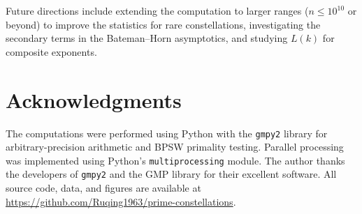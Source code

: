 \documentclass[11pt,a4paper]{article}
\begin{document}
Future directions include extending the computation to larger ranges ($n \le 10^{10}$ or beyond) to improve the statistics for rare constellations, investigating the secondary terms in the Bateman--Horn asymptotics, and studying $L(k)$ for composite exponents.

\section*{Acknowledgments}

The computations were performed using Python with the \texttt{gmpy2} library for arbitrary-precision arithmetic and BPSW primality testing. Parallel processing was implemented using Python's \texttt{multiprocessing} module. The author thanks the developers of \texttt{gmpy2} and the GMP library for their excellent software. All source code, data, and figures are available at \url{https://github.com/Ruqing1963/prime-constellations}.
\end{document}
